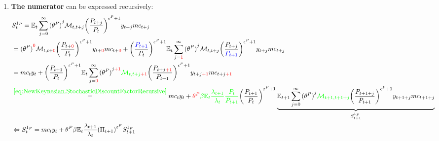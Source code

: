 \begin{enumerate}
\item 
\textbf{The numerator} can be expressed recursively:
{\small
\begin{align*}
&S^{1_{P}}_{t}
= \mathbb{E}_{t} \sum_{j=0}^{\infty} {(\theta^{P})}^{j} \mathcal{M}_{t,t+j} {\left(\frac{P_{t+j}}{P_{t}}\right)}^{\epsilon^{P}+1} y_{t+j} {mc}_{t+j}
\\
&= {(\theta^{P})}^{{\color{red}0}} \mathcal{M}_{t,t+{\color{red}0}} {\left(\frac{P_{t+{\color{red}0}}}{P_{t}}\right)}^{\epsilon^{P}+1} y_{t+{\color{red}0}} {mc}_{t+{\color{red}0}}
 + {\left(\frac{{\color{blue}P_{t+1}}}{P_{t}}\right)}^{\varepsilon^{P}+1}\mathbb{E}_{t} \sum_{j={\color{red}1}}^{\infty} {(\theta^{P})}^{j} \mathcal{M}_{t,t+j} {\left(\frac{P_{t+j}}{{\color{blue}P_{t+1}}}\right)}^{\epsilon^{P}+1} y_{t+j} {mc}_{t+j}
\\
&= {mc}_{t} y_{t}
 + {\left(\frac{P_{t+1}}{P_{t}}\right)}^{\varepsilon^{P}+1}\mathbb{E}_{t} \sum_{j={\color{red}0}}^{\infty} {(\theta^{P})}^{j{\color{red}+1}} {\color{green}\mathcal{M}_{t,t+j{\color{red}+1}}} {\left(\frac{P_{t+j{\color{red}+1}}}{P_{t+1}}\right)}^{\epsilon^{P}+1} y_{t+j{\color{red}+1}} {mc}_{t+j{\color{red}+1}}
\\
&\overset{{\color{green}\eqref{eq:NewKeynesian.StochasticDiscountFactorRecursive}}}{=} {mc}_{t} y_{t}
 + {\color{red}\theta^{P}} {\color{green} \beta \mathbb{E}_{t} \frac{\lambda_{t+1}}{\lambda_{t}} \frac{P_{t}}{P_{t+1}}}
 {\left(\frac{P_{t+1}}{P_{t}}\right)}^{\varepsilon^{P}+1}
 \underbrace{%
   \mathbb{E}_{t+1} \sum_{j=0}^{\infty} {(\theta^{P})}^{j} {\color{green}\mathcal{M}_{t+1,t+1+j}} {\left(\frac{P_{t+1+j}}{P_{t+1}}\right)}^{\epsilon^{P}+1} y_{t+1+j} {mc}_{t+1+j}
 }_{S^{1_{P}}_{t+1}}
\\
&\Leftrightarrow
S^{1_{P}}_{t}
= {mc}_{t} y_{t}
 + \theta^{P} \beta \mathbb{E}_{t} \frac{\lambda_{t+1}}{\lambda_{t}} {\left(\Pi_{t+1}\right)}^{\varepsilon^{P}} S^{1_{P}}_{t+1}
\end{align*}
}


\end{enumerate}
